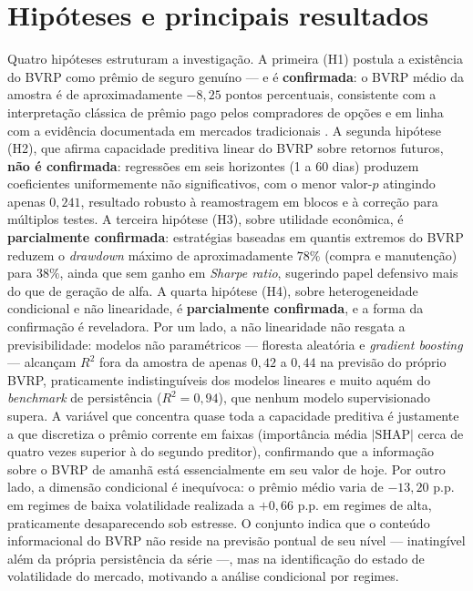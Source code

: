 \section*{Hipóteses e principais resultados}
\label{sec:cap1-hipoteses}

Quatro hipóteses estruturam a investigação. A primeira (H1) postula a existência do BVRP como prêmio de seguro genuíno --- e é \textbf{confirmada}: o BVRP médio da amostra é de aproximadamente $-8{,}25$ pontos percentuais, consistente com a interpretação clássica de prêmio pago pelos compradores de opções e em linha com a evidência documentada em mercados tradicionais \citep{carr2009variance, bollerslev2011VRP}. A segunda hipótese (H2), que afirma capacidade preditiva linear do BVRP sobre retornos futuros, \textbf{não é confirmada}: regressões em seis horizontes (1 a 60 dias) produzem coeficientes uniformemente não significativos, com o menor valor-$p$ atingindo apenas $0{,}241$, resultado robusto à reamostragem em blocos e à correção para múltiplos testes. A terceira hipótese (H3), sobre utilidade econômica, é \textbf{parcialmente confirmada}: estratégias baseadas em quantis extremos do BVRP reduzem o \textit{drawdown} máximo de aproximadamente $78\%$ (compra e manutenção) para $38\%$, ainda que sem ganho em \textit{Sharpe ratio}, sugerindo papel defensivo mais do que de geração de alfa. A quarta hipótese (H4), sobre heterogeneidade condicional e não linearidade, é \textbf{parcialmente confirmada}, e a forma da confirmação é reveladora. Por um lado, a não linearidade não resgata a previsibilidade: modelos não paramétricos --- floresta aleatória e \textit{gradient boosting} --- alcançam $R^2$ fora da amostra de apenas $0{,}42$ a $0{,}44$ na previsão do próprio BVRP, praticamente indistinguíveis dos modelos lineares e muito aquém do \textit{benchmark} de persistência ($R^2 = 0{,}94$), que nenhum modelo supervisionado supera. A variável que concentra quase toda a capacidade preditiva é justamente a que discretiza o prêmio corrente em faixas (importância média $|\text{SHAP}|$ cerca de quatro vezes superior à do segundo preditor), confirmando que a informação sobre o BVRP de amanhã está essencialmente em seu valor de hoje. Por outro lado, a dimensão condicional é inequívoca: o prêmio médio varia de $-13{,}20$ p.p. em regimes de baixa volatilidade realizada a $+0{,}66$ p.p. em regimes de alta, praticamente desaparecendo sob estresse. O conjunto indica que o conteúdo informacional do BVRP não reside na previsão pontual de seu nível --- inatingível além da própria persistência da série ---, mas na identificação do estado de volatilidade do mercado, motivando a análise condicional por regimes.


